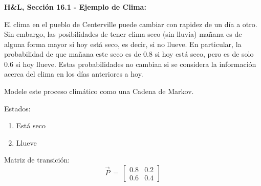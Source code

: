 \documentclass[ 10pt, xcolor = dvipsnames]{beamer}
\begin{document}
\begin{frame}[allowframebreaks]
\frametitle{\insertsubsection}

\textbf{H\&L, Secci\'on 16.1 - Ejemplo de Clima:}

El clima en el pueblo de Centerville puede cambiar con rapidez de un d\'ia a otro. Sin embargo, las posibilidades de tener clima seco (sin lluvia) ma\~nana es de alguna forma mayor si hoy est\'a seco, es decir, si no llueve. En particular, \linebreak la probabilidad de que ma\~nana este seco es de 0.8 si hoy est\'a seco, pero \linebreak es de solo 0.6 si hoy llueve. Estas probabilidades no cambian si se considera \linebreak la informaci\'on acerca del clima en los d\'ias anteriores a hoy. 

Modele este proceso clim\'atico como una Cadena de Markov. 
\framebreak

Estados: 
\begin{enumerate}
\item Est\'a seco
\item Llueve
\end{enumerate}

Matriz de transici\'on:
\[
\vec{P} \, = \, 
\left[
\begin{array}{cc}
0.8 & 0.2 \\ 0.6 & 0.4
\end{array}
\right]
\]

\end{frame}
\end{document}
